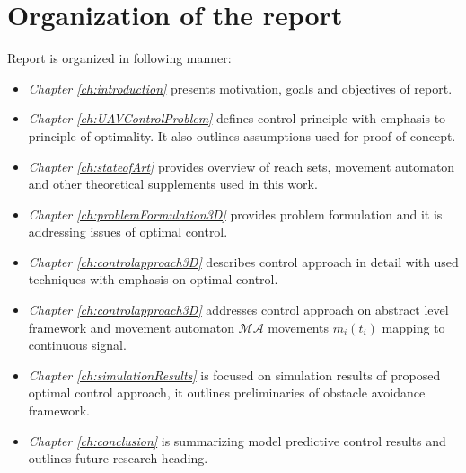 \section{Organization of the report}\noindent
Report is organized in following manner:
\begin{itemize}
    \item\textit{Chapter \ref{ch:introduction}} presents motivation, goals and objectives of report.
    \item\textit{Chapter \ref{ch:UAVControlProblem}} defines control principle with emphasis to principle of optimality. It also outlines assumptions used for proof of concept.
    \item\textit{Chapter \ref{ch:stateofArt}} provides overview of reach sets, movement automaton and other theoretical supplements used in this work.
    \item\textit{Chapter \ref{ch:problemFormulation3D}} provides problem formulation and it is addressing issues of optimal control.
    \item\textit{Chapter \ref{ch:controlapproach3D}} describes control approach in detail with used techniques with emphasis on optimal control.
    \item\textit{Chapter \ref{ch:controlapproach3D}} addresses control approach on abstract level framework and movement automaton $\mathscr{MA}$ movements $m_i(t_i)$ mapping to continuous signal.
    \item\textit{Chapter \ref{ch:simulationResults}} is focused on simulation results of proposed optimal control approach, it outlines preliminaries of obstacle avoidance framework.
    \item\textit{Chapter \ref{ch:conclusion}} is summarizing model predictive control results and outlines future research heading. 
\end{itemize}